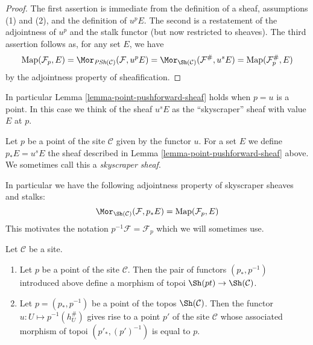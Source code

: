 \begin{proof}
The first assertion is immediate from the definition of a sheaf, assumptions
(1) and (2), and the definition of $u^pE$. The second is a restatement of the
adjointness of $u^p$ and the stalk functor (but now restricted to sheaves).
The third assertion follows as, for any set $E$, we have
$$
\text{Map}(\mathcal{F}_p, E) =
\Mor_{\textit{PSh}(\mathcal{C})}(\mathcal{F}, u^pE) =
\Mor_{\Sh(\mathcal{C})}(\mathcal{F}^\#, u^sE) =
\text{Map}(\mathcal{F}^\#_p, E)
$$
by the adjointness property of sheafification.
\end{proof}

\noindent
In particular Lemma \ref{lemma-point-pushforward-sheaf}
holds when $p = u$ is a point. In this case we think of the
sheaf $u^sE$ as the ``skyscraper'' sheaf with value $E$ at $p$.

\begin{definition}
\label{definition-pushforward-point}
Let $p$ be a point of the site $\mathcal{C}$ given by the functor $u$.
For a set $E$ we define $p_*E = u^sE$ the sheaf
described in Lemma \ref{lemma-point-pushforward-sheaf} above.
We sometimes call this a {\it skyscraper sheaf}.
\end{definition}

\noindent
In particular we have the following adjointness property
of skyscraper sheaves and stalks:
$$
\Mor_{\Sh(\mathcal{C})}(\mathcal{F}, p_*E)
=
\text{Map}(\mathcal{F}_p, E)
$$
This motivates the notation $p^{-1}\mathcal{F} = \mathcal{F}_p$
which we will sometimes use.

\begin{lemma}
\label{lemma-point-site-topos}
Let $\mathcal{C}$ be a site.
\begin{enumerate}
\item Let $p$ be a point of the site $\mathcal{C}$.
Then the pair of functors $(p_*, p^{-1})$ introduced
above define a morphism of topoi
$\Sh(pt) \to \Sh(\mathcal{C})$.
\item Let $p = (p_*, p^{-1})$
be a point of the topos $\Sh(\mathcal{C})$.
Then the functor $u : U \mapsto p^{-1}(h_U^\#)$ gives
rise to a point $p'$ of the site $\mathcal{C}$
whose associated morphism of topoi $(p'_*, (p')^{-1})$
is equal to $p$.
\end{enumerate}
\end{lemma}

